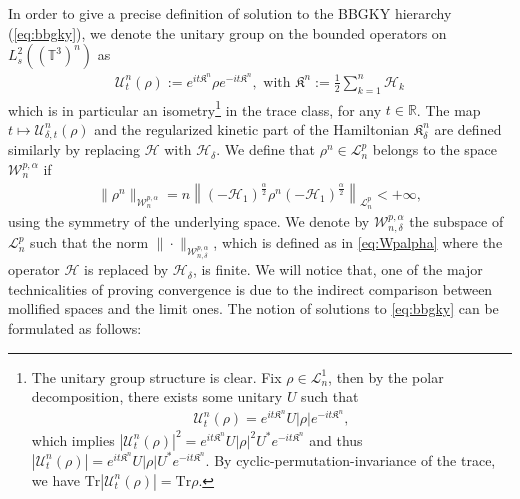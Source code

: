 In order to give a precise definition of solution to the BBGKY hierarchy
(\ref{eq:bbgky}), we denote the unitary group on the bounded operators on
$L_s^2 ((\mathbb{T}^3)^n)$ as
\begin{align}\label{eq:def-unitary}
\mathcal{U}^n_t (\rho) := e^{it\mathfrak{K}^n} \rho e^{-it\mathfrak{K}^n},  \text{ with } \mathfrak{K}^n := \frac{1}{2}\sum^n_{k = 1}
   \mathcal{H}_{k} 
\end{align} 
which is in particular an isometry\footnote{The unitary group structure is clear. Fix $\rho \in \mathcal{L}^1_n$, then by the polar decomposition, there exists some unitary $U$ such that
  \begin{align*}
  \mathcal{U}^n_t(\rho) = e^{it\mathfrak{K}^n} U |\rho| e^{-it\mathfrak{K}^n},     
  \end{align*}
  which implies $ |\mathcal{U}^n_t (\rho) |^2 = e^{it\mathfrak{K}^n} U | \rho |^2 U^{\ast}e^{-it\mathfrak{K}^n}$ and thus $|\mathcal{U}^n_t (\rho)| = e^{it\mathfrak{K}^n} U | \rho | U^{\ast}e^{-it\mathfrak{K}^n}$. By cyclic-permutation-invariance of the trace, we have $\mathrm{Tr}|\mathcal{U}^n_t (\rho)| = \mathrm{Tr} \rho$.} in the trace class, for any $t \in \mathbb{R}$. The map $t \mapsto \mathcal{U}^n_{\delta, t}(\rho)$ and the regularized kinetic part of the Hamiltonian 
$\mathfrak{K}^n_{\delta}$
are defined similarly by replacing $\mathcal{H}$ with $\mathcal{H}_{\delta}$.
We define that $\rho^n \in \mathcal{L}^p_n$
belongs to the space $\mathcal{W}^{p, \alpha}_{n}$ if
\begin{align}
  \| \rho^n \|_{\mathcal{W}^{p, \alpha}_{n}} = n \left\| (-
  \mathcal{H}_{1})^{\frac{\alpha}{2}} \rho^n (- \mathcal{H}_{
  1})^{\frac{\alpha}{2}} \right\|_{\mathcal{L}^p_n} < + \infty, \label{eq:Wpalpha}
\end{align}
using the symmetry of the underlying space. We denote by $\mathcal{W}^{p,
\alpha}_{n,\delta}$ the subspace of $\mathcal{L}^p_n$ such that the norm $\| \cdot
\|_{\mathcal{W}^{p, \alpha}_{n,\delta}}$, which is defined as in \eqref{eq:Wpalpha}
where the operator $\mathcal{H}$ is replaced by $\mathcal{H}_{\delta}$, is finite. We will notice that, one of the major technicalities of proving convergence is due to the indirect comparison between mollified spaces and the limit ones. The notion of solutions to
\eqref{eq:bbgky} can be formulated as follows:


